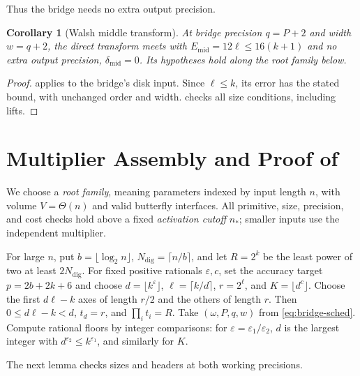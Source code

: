 \documentclass[11pt]{article}
\newtheorem{corollary}[theorem]{Corollary}
\theoremstyle{definition}
\renewcommand{\label}[1]{}%
\newcommand{\eps}{\varepsilon}
\begin{document}
Thus the bridge needs no extra output precision.

\begin{corollary}[Walsh middle transform]\label{cor:walsh-middle}
At bridge precision $q=P+2$ and width $w=q+2$, the direct transform meets
 with $E_{\mathrm{mid}}=12\ell\le16(k+1)$
and no extra output precision, $\delta_{\mathrm{mid}}=0$.
Its hypotheses hold along the root family below.
\end{corollary}
\begin{proof}
 applies to the bridge's disk input.
Since $\ell\le k$, its error has the stated bound, with unchanged order and width.
 checks all size conditions, including lifts.
\end{proof}

\section{Multiplier Assembly and Proof of \texorpdfstring{}{Theorem 1.1}}\label{sec:multiplier}

We choose a \emph{root family}, meaning parameters indexed by input length $n$, with volume $V=\Theta(n)$ and valid butterfly interfaces.
All primitive, size, precision, and cost checks hold above a fixed \emph{activation cutoff} $n_*$; smaller inputs use the independent multiplier.

For large $n$, put $b=\lfloor\log_2n\rfloor$,
$N_{\mathrm{dig}}=\lceil n/b\rceil$, and let $R=2^k$ be the least power of two
at least $2N_{\mathrm{dig}}$.
For fixed positive rationals $\eps,c$, set the accuracy target $p=2b+2k+6$ and choose
$d=\lfloor k^\eps\rfloor$, $\ell=\lceil k/d\rceil$, $r=2^\ell$, and $K=\lfloor d^c\rfloor$.
Choose the first $d\ell-k$ axes of length $r/2$ and the others of length $r$.
Then $0\le d\ell-k<d$, $t_d=r$, and $\prod_i t_i=R$.
Take $(\omega,P,q,w)$ from \eqref{eq:bridge-sched}.
Compute rational floors by integer comparisons: for $\eps=\eps_1/\eps_2$,
$d$ is the largest integer with $d^{\eps_2}\le k^{\eps_1}$, and similarly for $K$.

The next lemma checks sizes and headers at both working precisions.
\end{document}
